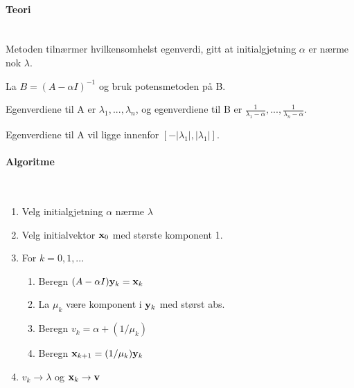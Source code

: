 \paragraph{Teori} \hfill \\
Metoden tilnærmer hvilkensomhelst egenverdi,
gitt at initialgjetning $\alpha$ er nærme nok $\lambda$.

La $B = (A - \alpha I)^{-1}$ og bruk potensmetoden på B.

Egenverdiene til A er $\lambda_1, ..., \lambda_n$,
og egenverdiene til B er
$\frac{1}{\lambda_1 - \alpha}, ..., \frac{1}{\lambda_n - \alpha}$.

Egenverdiene til A vil ligge innenfor $[-|\lambda_1|, |\lambda_1|]$.



\paragraph{Algoritme} \hfill \\
\begin{enumerate}
  \item Velg initialgjetning $\alpha$ nærme $\lambda$
  \item Velg initialvektor $\mathbf{x}_0$ med største komponent 1.
  \item For $k = 0,1,...$
    \begin{enumerate}[label=\alph*]
      \item Beregn $(A-\alpha I)\mathbf{y}_k = \mathbf{x}_k$
      \item La $\mu_k$ være komponent i $\mathbf{y}_k$ med størst abs.
      \item Beregn $v_k = \alpha + (1/\mu_k)$
      \item Beregn $\mathbf{x}_{k+1} = (1/\mu_k)\mathbf{y}_k$
    \end{enumerate}
  \item $v_k \to \lambda$ og $\mathbf{x}_k \to \mathbf{v}$
\end{enumerate}
